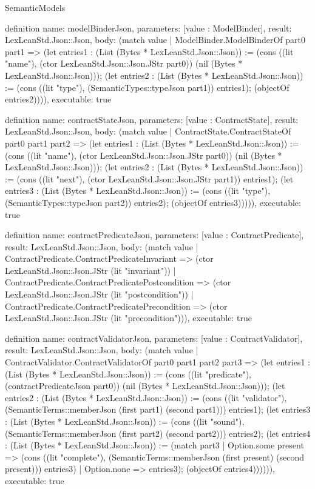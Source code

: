\begin{lexlean}{SemanticModels}
\begin{semanticmodule}
definition{
  name: modelBinderJson,
  parameters: [value : ModelBinder],
  result: LexLeanStd.Json::Json,
  body: (match value
    | ModelBinder.ModelBinderOf part0 part1 => (let entries1 : (List (Bytes * LexLeanStd.Json::Json)) := (cons ((lit "name"), (ctor LexLeanStd.Json::Json.JStr part0)) (nil (Bytes * LexLeanStd.Json::Json))); (let entries2 : (List (Bytes * LexLeanStd.Json::Json)) := (cons ((lit "type"), (SemanticTypes::typeJson part1)) entries1); (objectOf entries2)))),
  executable: true
}

definition{
  name: contractStateJson,
  parameters: [value : ContractState],
  result: LexLeanStd.Json::Json,
  body: (match value
    | ContractState.ContractStateOf part0 part1 part2 => (let entries1 : (List (Bytes * LexLeanStd.Json::Json)) := (cons ((lit "name"), (ctor LexLeanStd.Json::Json.JStr part0)) (nil (Bytes * LexLeanStd.Json::Json))); (let entries2 : (List (Bytes * LexLeanStd.Json::Json)) := (cons ((lit "next"), (ctor LexLeanStd.Json::Json.JStr part1)) entries1); (let entries3 : (List (Bytes * LexLeanStd.Json::Json)) := (cons ((lit "type"), (SemanticTypes::typeJson part2)) entries2); (objectOf entries3))))),
  executable: true
}

definition{
  name: contractPredicateJson,
  parameters: [value : ContractPredicate],
  result: LexLeanStd.Json::Json,
  body: (match value
    | ContractPredicate.ContractPredicateInvariant => (ctor LexLeanStd.Json::Json.JStr (lit "invariant"))
    | ContractPredicate.ContractPredicatePostcondition => (ctor LexLeanStd.Json::Json.JStr (lit "postcondition"))
    | ContractPredicate.ContractPredicatePrecondition => (ctor LexLeanStd.Json::Json.JStr (lit "precondition"))),
  executable: true
}

definition{
  name: contractValidatorJson,
  parameters: [value : ContractValidator],
  result: LexLeanStd.Json::Json,
  body: (match value
    | ContractValidator.ContractValidatorOf part0 part1 part2 part3 => (let entries1 : (List (Bytes * LexLeanStd.Json::Json)) := (cons ((lit "predicate"), (contractPredicateJson part0)) (nil (Bytes * LexLeanStd.Json::Json))); (let entries2 : (List (Bytes * LexLeanStd.Json::Json)) := (cons ((lit "validator"), (SemanticTerms::memberJson (first part1) (second part1))) entries1); (let entries3 : (List (Bytes * LexLeanStd.Json::Json)) := (cons ((lit "sound"), (SemanticTerms::memberJson (first part2) (second part2))) entries2); (let entries4 : (List (Bytes * LexLeanStd.Json::Json)) := (match part3
      | Option.some present => (cons ((lit "complete"), (SemanticTerms::memberJson (first present) (second present))) entries3)
      | Option.none => entries3); (objectOf entries4)))))),
  executable: true
}


\end{semanticmodule}
\end{lexlean}
